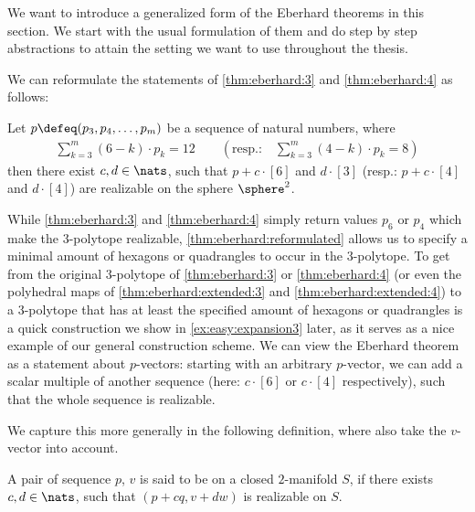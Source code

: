 \label{sec:gen:eberhard}

We want to introduce a generalized form of the {\sc Eberhard} theorems in this section. We start with the usual formulation of them and do step by step abstractions to attain the setting we want to use throughout the thesis.

\clearpage
We can reformulate the statements of \autoref{thm:eberhard:3} and \autoref{thm:eberhard:4} as follows:
\begin{theorem}\label{thm:eberhard:reformulated}
  Let $p \defeq (p_3, p_4, \dots, p_m)$ be a sequence of natural numbers, where
  \begin{align*}
    \sum_{k=3}^m(6 - k) \cdot p_k = 12 \qquad \left( \text{resp.:}\quad \sum_{k=3}^m(4 - k) \cdot p_k = 8 \right)
  \end{align*}
  then there exist $c, d \in \nats$, such that $p + c \cdot [6]$ and $d \cdot [3]$ (resp.: $p + c \cdot [4]$ and $d \cdot [4]$) are realizable on the sphere $\sphere^2$.
\end{theorem}

\begin{remark}\label{rem:gen:is:no:gen}
While \autoref{thm:eberhard:3} and \autoref{thm:eberhard:4} simply return values $p_6$ or $p_4$ which make the $3$-polytope realizable, \autoref{thm:eberhard:reformulated} allows us to specify a minimal amount of hexagons or quadrangles to occur in the $3$-polytope. To get from the original $3$-polytope of \autoref{thm:eberhard:3} or \autoref{thm:eberhard:4} (or even the polyhedral maps of \autoref{thm:eberhard:extended:3} and \autoref{thm:eberhard:extended:4}) to a $3$-polytope that has at least the specified amount of hexagons or quadrangles is a quick construction we show in \autoref{ex:easy:expansion3} later, as it serves as a nice example of our general construction scheme. We can view the {\sc Eberhard} theorem as a statement about $p$-vectors: starting with an arbitrary $p$-vector, we can add a scalar multiple of another sequence (here: $c \cdot [6]$ or $c \cdot [4]$ respectively), such that the whole sequence is realizable.
\end{remark}

We capture this more generally in the following definition, where also take the $v$-vector into account.
\begin{definition}[$q$-$w$-realizable]\label{def:eberhard:realizable}
  A pair of sequence $p$, $v$ is said to be  on a closed $2$-manifold $S$, if there exists $c, d \in \nats$, such that $(p + c q, v + d w)$ is realizable on $S$. 
\end{definition}

